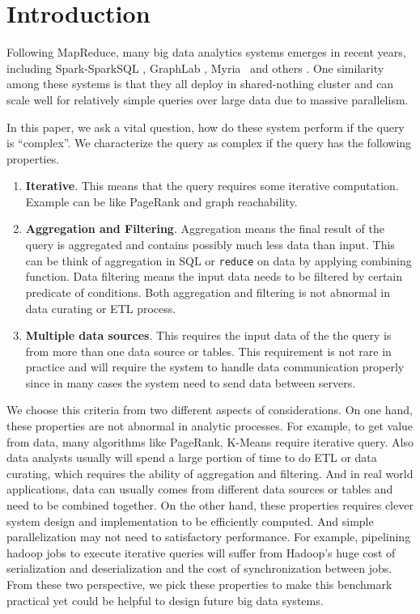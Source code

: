 \section{Introduction}

Following MapReduce, many big data analytics systems emerges in recent years, 
including Spark-SparkSQL \cite{XinRZFSS13SIGMOD, ZahariaCDDMMFSS12NSDI}, 
GraphLab \cite{GonzalezLGBG12OSDI}, Myria~\cite{HalperinACCKMORWWXBHS14SIGMOD} 
and others \cite{AbouzeidBARS09PVLDB,ThusooSJSCZALM10ICDE}. One similarity 
among these systems is that they all deploy in shared-nothing cluster and can 
scale well for relatively simple queries over large data due to massive 
parallelism. 

In this paper, we ask a vital question, how do these system perform if the
query is ``complex''. We characterize the query as complex if the query has 
the following properties.

\begin{enumerate}

\item \textbf{Iterative}. This means that the query requires some
iterative computation. Example can be like PageRank and graph reachability. 

\item \textbf{Aggregation and Filtering}. Aggregation means the final
result of the query is aggregated and contains possibly much less data
than input. This can be think of aggregation in SQL or \texttt{reduce} on data
by applying combining function. Data filtering means the input data needs to be
filtered by certain predicate of conditions. Both aggregation and filtering is 
not abnormal in data curating or ETL process.

\item \textbf{Multiple data sources}. This requires the input data of the 
the query is from more than one data source or tables. This requirement is not
rare in practice and will require the system to handle data communication
properly since in many cases the system need to send data between servers.

\end{enumerate}

We choose this criteria from two different aspects of considerations. On one
 hand, these properties are not abnormal in analytic processes.
  For example, to 
get value from data, many algorithms like PageRank, K-Means require iterative
query. Also data analysts usually will spend a large portion of time to do ETL
or data curating, which requires the ability of aggregation and filtering. And 
in real world applications, data can usually comes from different data 
sources or tables and need to be combined together. On the other hand, these
properties requires clever system design and implementation to be efficiently
computed. And simple parallelization may not need to satisfactory 
performance. For example, pipelining hadoop jobs to execute iterative 
queries will suffer from Hadoop's huge cost of serialization and 
deserialization and the cost of synchronization between jobs. From these two 
perspective, we pick these properties to make this benchmark practical yet 
could be helpful to design future big data systems. 

